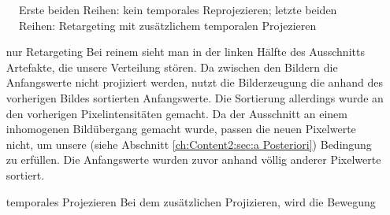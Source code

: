 \begin{figure}[H]
\begin{tcolorbox}[boxrule=4pt,sharp corners=downhill,title=Szene unter Kamerabewegung, fonttitle=\bfseries]
\begin{subfigure}[b]{0.2\linewidth}
         \caption{}
         \label{pic:TemporalRepr_4}
    \end{subfigure}
  \end{tcolorbox}
    \caption{Erste beiden Reihen: kein temporales Reprojezieren; letzte beiden Reihen: Retargeting mit zusätzlichem temporalen Projezieren}
    \label{fig:Auswirkung temporales Projezieren}
\end{figure}

\begin{itemize}
  \item[nur Retargeting] Bei reinem  sieht man in der linken Hälfte des Ausschnitts Artefakte, die unsere 
                          Verteilung stören. Da zwischen den Bildern die Anfangswerte nicht projiziert
                         werden, nutzt die Bilderzeugung die anhand des vorherigen Bildes sortierten Anfangswerte. Die Sortierung allerdings
                         wurde an den vorherigen Pixelintensitäten gemacht. Da der Ausschnitt an einem inhomogenen Bildübergang gemacht wurde,
                         passen die neuen Pixelwerte nicht, um unsere (siehe Abschnitt \ref{ch:Content2:sec:a Posteriori})
                         Bedingung zu erfüllen. Die Anfangswerte wurden zuvor anhand völlig anderer Pixelwerte sortiert.                  
  \item[temporales Projezieren] Bei dem zusätzlichen Projizieren, wird die Bewegung
\end{itemize}

